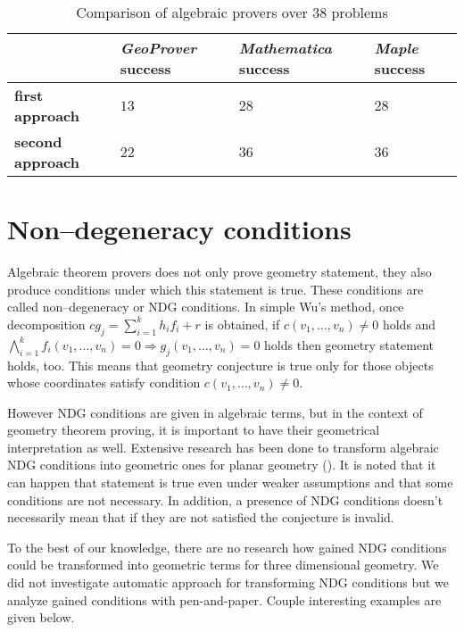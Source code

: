 \documentclass[final,1p,times,authoryear]{elsarticle}
\begin{document}
\begin{table}[!hb]
\begin{center}
\begin{tabular}{L{2cm}||R{2cm}|R{2cm}|R{2cm}}
\                      & \emph{GeoProver}  success & \emph{Mathematica} success & \emph{Maple} success \\
\hline
\hline
\textbf{first approach}  &  $13$  & $28$ & $28$  \\
\hline
\textbf{second approach} &  $22$  & $36$ & $36$ \\
\end{tabular}
\caption{Comparison of algebraic provers over $38$ problems}
\end{center}
\end{table}


\section{Non--degeneracy conditions}


Algebraic theorem provers does not only prove geometry statement, they
also produce conditions under which this statement is true. These
conditions are called non--degeneracy or NDG conditions. In simple
Wu's method, once decomposition $cg_j = \sum_{i=1}^{k}h_if_i + r$ is
obtained, if $c(v_1, \ldots, v_n) \neq 0$ holds and $\bigwedge_{i =
  1}^{k} f_i(v_1, \ldots, v_n) = 0 \Longrightarrow g_j(v_1, \ldots,
v_n) = 0$ holds then geometry statement holds, too. This means that
geometry conjecture is true only for those objects whose coordinates
satisfy condition $c(v_1, \ldots, v_n) \neq 0$.  

However NDG conditions are given in algebraic terms, but in the
context of geometry theorem proving, it is important to have their
geometrical interpretation as well. Extensive research has been done
to transform algebraic NDG conditions into geometric ones for planar
geometry (\cite{chou1988mechanical}). It is noted that it can happen
that statement is true even under weaker assumptions and that some
conditions are not necessary. In addition, a presence of NDG
conditions doesn’t necessarily mean that if they are not satisfied the
conjecture is invalid.

To the best of our knowledge, there are no research how gained NDG
conditions could be transformed into geometric terms for three
dimensional geometry. We did not investigate automatic approach for
transforming NDG conditions but we analyze gained conditions with
pen-and-paper. Couple interesting examples are given below.
\end{document}
